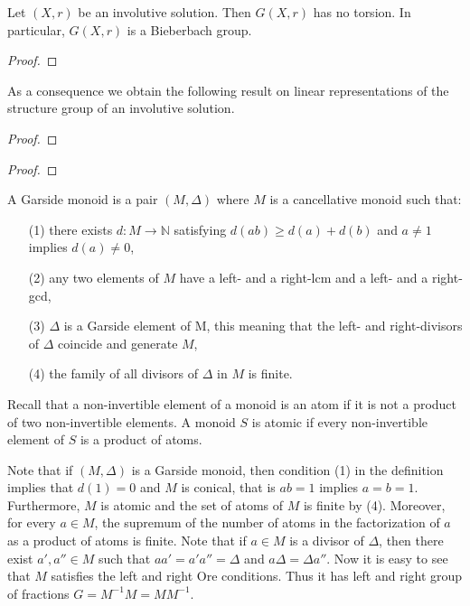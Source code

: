 \begin{theorem}
\label{thm:torsion_free}
Let $(X,r)$ be an involutive solution. Then $G(X,r)$ has no torsion. In particular, $G(X,r)$ is a Bieberbach group.
\end{theorem}

\begin{proof}

\end{proof}

As a consequence we obtain the following result on linear 
representations of the structure group of an involutive solution.

\begin{theorem}
\label{thm:ESS}
\end{theorem}

\begin{proof}

\end{proof}

\begin{theorem}
\label{thm:D}
\end{theorem}

\begin{proof}

\end{proof}

\begin{definition} A Garside monoid is a pair $(M,\Delta)$ where $M$ is a
cancellative  monoid such that:
\begin{itemize}
\item[(1)] there exists $d: M \longrightarrow\mathbb{N}$ satisfying
$d(ab)\geq d(a) + d(b)$ and $a\neq 1$ implies $d(a)\neq 0$,
\item[(2)] any two elements of $M$ have a left- and a right-lcm and a left- and
a right-gcd,
\item[(3)]  $\Delta$ is a Garside element of M, this meaning that
the left- and right-divisors of $\Delta$ coincide and generate $M$,
\item[(4)] the family of all divisors of $\Delta$ in $M$ is finite.
\end{itemize}
\end{definition}

Recall that a non-invertible element of a monoid is an atom if it is
not a product of two non-invertible elements. A monoid $S$ is atomic
if every non-invertible element of $S$ is a product of atoms.


Note that if $(M,\Delta)$ is a Garside monoid, then condition (1) in
the definition implies that $d(1)=0$ and $M$ is conical, that is
$ab=1$ implies $a=b=1$. Furthermore, $M$ is atomic and the set of
atoms of $M$ is finite by (4). Moreover, for every $a\in M$, the
supremum of the number of atoms in the factorization of $a$ as a
product of atoms is finite. Note that if $a\in M$ is a divisor of
$\Delta$, then there exist $a',a''\in M$ such that
$aa'=a'a''=\Delta$ and $a\Delta=\Delta a''$. Now it is easy to see
that $M$ satisfies the left and right Ore conditions. Thus it has
left and right group of fractions $G=M^{-1}M=MM^{-1}$.

